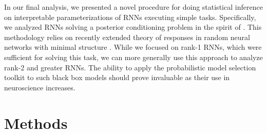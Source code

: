 \documentclass[11pt]{article}
\begin{document}
In our final analysis, we presented a novel procedure for doing statistical inference on interpretable parameterizations of RNNs executing simple tasks. 
Specifically, we analyzed RNNs solving a posterior conditioning problem in the spirit of \cite{echeveste2019cortical}. 
This methodology relies on recently extended theory of responses in random neural networks with minimal structure \cite{mastrogiuseppe2018linking}. 
While we focused on rank-1 RNNs, which were sufficient for solving this task, we can more generally use this approach to analyze rank-2 and greater RNNs.
The ability to apply the probabilistic model selection toolkit to such black box models should prove invaluable as their use in neuroscience increases.






\appendix

\section{Methods}
\end{document}
